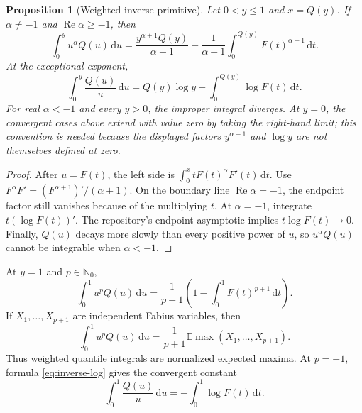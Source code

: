 \documentclass[11pt,oneside]{article}
\newtheorem{proposition}[theorem]{Proposition}
\theoremstyle{definition}
\theoremstyle{remark}
\newcommand{\E}{\mathbb E}
\newcommand{\N}{\mathbb N}
\newcommand{\dd}{\,\mathrm d}
\newcommand{\1}{\mathbf 1}
\DeclareMathOperator{\Rea}{Re}
\begin{document}
\begin{proposition}[Weighted inverse primitive]\label{prop:inverse-weighted}
Let \(0<y\leq1\) and \(x=Q(y)\).  If \(\alpha\neq-1\) and
\(\Rea\alpha\geq-1\), then
\begin{equation}
 \boxed{\quad
 \int_0^yu^\alpha Q(u)\dd u
 =\frac{y^{\alpha+1}Q(y)}{\alpha+1}
 -\frac1{\alpha+1}\int_0^{Q(y)}F(t)^{\alpha+1}\dd t.
 \quad}                                                        \label{eq:inverse-weighted}
\end{equation}
At the exceptional exponent,
\begin{equation}
 \boxed{\quad
 \int_0^y\frac{Q(u)}u\dd u
 =Q(y)\log y-\int_0^{Q(y)}\log F(t)\dd t.
 \quad}                                                        \label{eq:inverse-log}
\end{equation}
For real \(\alpha<-1\) and every \(y>0\), the improper integral diverges.
At \(y=0\), the convergent cases above extend with value zero by taking the
right-hand limit; this convention is needed because the displayed factors
\(y^{\alpha+1}\) and \(\log y\) are not themselves defined at zero.
\end{proposition}

\begin{proof}
After \(u=F(t)\), the left side is
\(\int_0^xtF(t)^\alpha F'(t)\dd t\).  Use
\(F^\alpha F'=(F^{\alpha+1})'/(\alpha+1)\).  On the boundary line
\(\Rea\alpha=-1\), the endpoint factor still vanishes because of the
multiplying \(t\).  At \(\alpha=-1\), integrate
\(t(\log F(t))'\).  The repository's endpoint asymptotic implies
\(t\log F(t)\to0\).  Finally, \(Q(u)\) decays more slowly than every positive
power of \(u\), so \(u^\alpha Q(u)\) cannot be integrable when
\(\alpha<-1\).
\end{proof}

At \(y=1\) and \(p\in\N_0\),
\begin{equation}
 \boxed{\quad
 \int_0^1u^pQ(u)\dd u
 =\frac1{p+1}\left(1-\int_0^1F(t)^{p+1}\dd t\right).
 \quad}                                                        \label{eq:inverse-definite-p}
\end{equation}
If \(X_1,\ldots,X_{p+1}\) are independent Fabius variables, then
\begin{equation}
 \int_0^1u^pQ(u)\dd u
 =\frac1{p+1}\E\max(X_1,\ldots,X_{p+1}).                       \label{eq:inverse-order-stat}
\end{equation}
Thus weighted quantile integrals are normalized expected maxima.
At \(p=-1\), formula \eqref{eq:inverse-log} gives the convergent constant
\begin{equation}
 \int_0^1\frac{Q(u)}u\dd u=-\int_0^1\log F(t)\dd t.            \label{eq:inverse-log-constant}
\end{equation}
\end{document}
